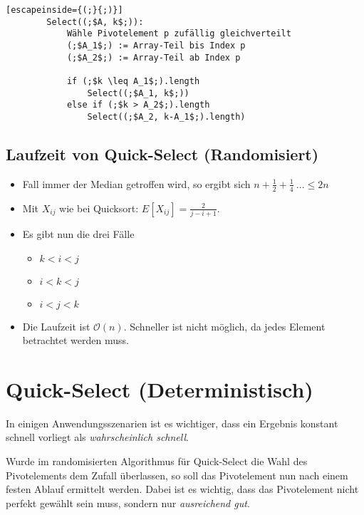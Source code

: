 \documentclass{scrartcl}%
\begin{document}
    \begin{lstlisting}[escapeinside={(;}{;)}]
        Select((;$A, k$;)):
            Wähle Pivotelement p zufällig gleichverteilt
            (;$A_1$;) := Array-Teil bis Index p
            (;$A_2$;) := Array-Teil ab Index p

            if (;$k \leq A_1$;).length
                Select((;$A_1, k$;))
            else if (;$k > A_2$;).length
                Select((;$A_2, k-A_1$;).length)
    \end{lstlisting}

    \subsection*{Laufzeit von Quick-Select (Randomisiert)}\label{subsec:laufzeitVonQuick-selectrandomisiert}
    \begin{itemize}
        \item Fall immer der Median getroffen wird, so ergibt sich $n+\frac{1}{2}+\frac{1}{4}\ ... \leq 2n$
        \item Mit $X_{ij}$ wie bei Quicksort: $E[X_{ij}] = \frac{2}{j-i+1}$.
        \item [] Es gibt nun die drei Fälle
        \begin{itemize}
            \item $k<i<j$
            \item $i<k<j$
            \item $i<j<k$
        \end{itemize}
        \item [\Rightarrow] Die Laufzeit ist $\mathcal{O}(n)$.
        Schneller ist nicht möglich, da jedes Element betrachtet werden muss.
    \end{itemize}

    \section*{Quick-Select (Deterministisch)}\label{sec:quick-selectdeterministisch}
    In einigen Anwendungsszenarien ist es wichtiger, dass ein Ergebnis konstant schnell vorliegt als \textit{wahrscheinlich schnell}.

    Wurde im randomisierten Algorithmus für Quick-Select die Wahl des Pivotelements dem Zufall überlassen,
    so soll das Pivotelement nun nach einem festen Ablauf ermittelt werden.
    Dabei ist es wichtig, dass das Pivotelement nicht perfekt gewählt sein muss, sondern nur \textit{ausreichend gut}.
\end{document}
